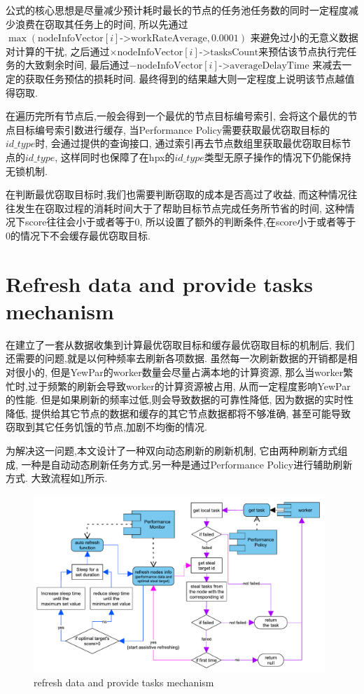 \documentclass{mproj}
\begin{document}
公式的核心思想是尽量减少预计耗时最长的节点的任务池任务数的同时一定程度减少浪费在窃取其任务上的时间,
所以先通过$\max\left(\text{nodeInfoVector}[i]\texttt{->}\text{workRateAverage}, 0.0001 \right)$
来避免过小的无意义数据对计算的干扰,
之后通过$\times \text{nodeInfoVector}[i]\texttt{->}\text{tasksCount}$来预估该节点执行完任务的大致剩余时间,
最后通过$- \text{nodeInfoVector}[i]\texttt{->}\text{averageDelayTime}$
来减去一定的获取任务预估的损耗时间.
最终得到的结果越大则一定程度上说明该节点越值得窃取.

在遍历完所有节点后,一般会得到一个最优的节点目标编号索引,
会将这个最优的节点目标编号索引数进行缓存,
当Performance Policy需要获取最优窃取目标的$id\_type$时,
会通过提供的查询接口,
通过索引再去节点数组里获取最优窃取目标节点的$id\_type$,
这样同时也保障了在hpx的$id\_type$类型无原子操作的情况下仍能保持无锁机制.

在判断最优窃取目标时,我们也需要判断窃取的成本是否高过了收益,
而这种情况往往发生在窃取过程的消耗时间大于了帮助目标节点完成任务所节省的时间,
这种情况下score往往会小于或者等于0,
所以设置了额外的判断条件,在score小于或者等于0的情况下不会缓存最优窃取目标.


\section{Refresh data and provide tasks mechanism}

在建立了一套从数据收集到计算最优窃取目标和缓存最优窃取目标的机制后,
我们还需要的问题,就是以何种频率去刷新各项数据.
虽然每一次刷新数据的开销都是相对很小的,
但是YewPar的worker数量会尽量占满本地的计算资源,
那么当worker繁忙时,过于频繁的刷新会导致worker的计算资源被占用,
从而一定程度影响YewPar的性能.
但是如果刷新的频率过低,则会导致数据的可靠性降低,
因为数据的实时性降低,
提供给其它节点的数据和缓存的其它节点数据都将不够准确,
甚至可能导致窃取到其它任务饥饿的节点,加剧不均衡的情况.

为解决这一问题,本文设计了一种双向动态刷新的刷新机制,
它由两种刷新方式组成,
一种是自动动态刷新任务方式,另一种是通过Performance Policy进行辅助刷新方式.
大致流程如\cref{fig:refresh_provide}所示.

\begin{figure}[h]
    \centering %
    \includegraphics[width=0.98\textwidth]{images/refresh.pdf} %
    \caption{refresh data and provide tasks mechanism} %
    \label{fig:refresh_provide} %
\end{figure}
\FloatBarrier
\end{document}
